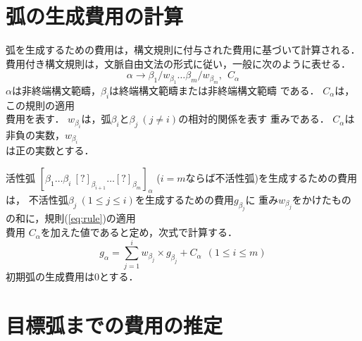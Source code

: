 \section{弧の生成費用の計算}
\label{sec:rule}

弧を生成するための費用は，構文規則に付与された費用に基づいて計算される．
費用付き構文規則は，文脈自由文法の形式に従い，一般に次のように表せる．
\begin{equation}
\alpha \rightarrow \beta_1/w_{\beta_1} \ldots \beta_m/w_{\beta_m},\ \ C_\alpha
\label{eq:rule}
\end{equation}
$\alpha$は非終端構文範疇，$\beta_i$は終端構文範疇または非終端構文範疇
である．
$C_\alpha$は，この規則の適用\\費用を表す．
$w_{\beta_i}$は，弧$\beta_i$と$\beta_j\ (j \neq i)$の相対的関係を表す
重みである．
$C_\alpha$は非負の実数，$w_{\beta_i}$\\は正の実数とする．

活性弧
$[\beta_1 \ldots \beta_i\ [?]_{\beta_{i+1}} \ldots [?]_{\beta_{m}}]_\alpha$
($i = m$ならば不活性弧)を生成するための費用は，
不活性弧$\beta_j\ (1 \le j \le i)$を生成するための費用$g_{\beta_j}$に
重み$w_{\beta_j}$をかけたものの和に，規則(\ref{eq:rule})の適用\\費用
$C_\alpha$を加えた値であると定め，次式で計算する．
\begin{equation}
g_\alpha = \sum_{j=1}^i w_{\beta_j} \times g_{\beta_j}  + C_\alpha\ \ (1 \le i \le m)
\label{eq:cost}
\end{equation}
初期弧の生成費用は0とする．

\section{目標弧までの費用の推定}
\label{sec:est}

